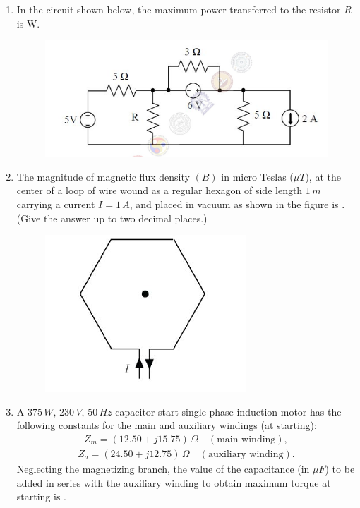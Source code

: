 \documentclass[journal,12pt,onecolumn]{IEEEtran}
\theoremstyle{remark}
\begin{document}
\begin{enumerate}
\item In the circuit shown below, the maximum power transferred to the resistor \(R\) is \underline{\hspace{2cm}} W.  

\begin{figure}[H]
    \centering
    \includegraphics[width=0.5\columnwidth]{figs/43.png}
    \caption{}
    \label{fig:placeholder}
\end{figure}


\item The magnitude of magnetic flux density \((B)\) in micro Teslas (\(\mu T\)), at the center of a loop of wire wound as a regular hexagon of side length \(1\,m\) carrying a current \(I=1\,A\), and placed in vacuum as shown in the figure is \underline{\hspace{2cm}}.  
(Give the answer up to two decimal places.)  

\begin{figure}[H]
    \centering
    \includegraphics[width=0.5\columnwidth]{figs/44.png}
    \caption{}
    \label{fig:placeholder}
\end{figure}


\item A \(375 \, W, \, 230 \, V, \, 50 \, Hz\) capacitor start single-phase induction motor has the following constants for the main and auxiliary windings (at starting):  
\begin{align*}
    Z_m = (12.50 + j15.75)\,\Omega \quad (\text{main winding}),
\end{align*}
\begin{align*}
    Z_a = (24.50 + j12.75)\,\Omega \quad (\text{auxiliary winding}).
\end{align*}
Neglecting the magnetizing branch, the value of the capacitance (in \(\mu F\)) to be added in series with the auxiliary winding to obtain maximum torque at starting is \underline{\hspace{2cm}}.



\end{enumerate}
\end{document}
